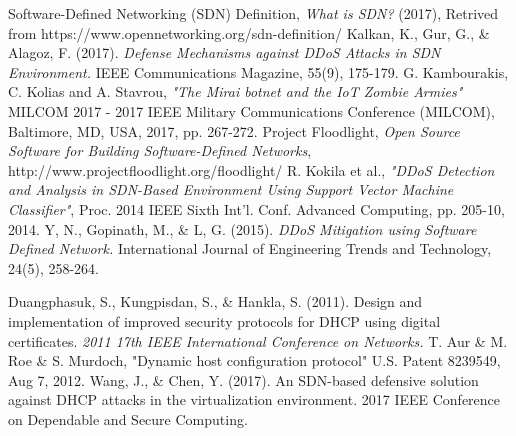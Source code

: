 \documentclass[conference,compsoc]{IEEEtran}
\begin{document}


%
%
%
\begin{thebibliography}{1}

Software-Defined Networking (SDN) Definition, {\em
What is SDN?} (2017), Retrived from https://www.opennetworking.org/sdn-definition/
Kalkan, K., Gur, G., \& Alagoz, F. (2017). {\em
Defense Mechanisms against DDoS Attacks in SDN Environment.} IEEE Communications Magazine, 55(9), 175-179.
G. Kambourakis, C. Kolias and A. Stavrou, {\em
"The Mirai botnet and the IoT Zombie Armies"} MILCOM 2017 - 2017 IEEE Military Communications Conference (MILCOM), Baltimore, MD, USA, 2017, pp. 267-272.
Project Floodlight, {\em
Open Source Software for Building Software-Defined Networks}, http://www.projectfloodlight.org/floodlight/
R. Kokila et al., {\em
"DDoS Detection and Analysis in SDN-Based Environment Using Support Vector Machine Classifier"}, Proc. 2014 IEEE Sixth Int'l. Conf. Advanced Computing, pp. 205-10, 2014.
Y, N., Gopinath, M., \& L, G. (2015). {\em
DDoS Mitigation using Software Defined Network.} International Journal of Engineering Trends and Technology, 24(5), 258-264. 

Duangphasuk, S., Kungpisdan, S., \& Hankla, S. (2011). Design and implementation of improved security protocols for DHCP using digital certificates. {\em2011 17th IEEE International Conference on Networks.}
T. Aur \& M. Roe \& S. Murdoch, "Dynamic host configuration protocol"
U.S. Patent 8239549, Aug 7, 2012. 
Wang, J., \& Chen, Y. (2017). An SDN-based defensive solution against DHCP attacks in the virtualization environment. 2017 IEEE Conference on Dependable and Secure Computing. 
\end{thebibliography}




\end{document}
